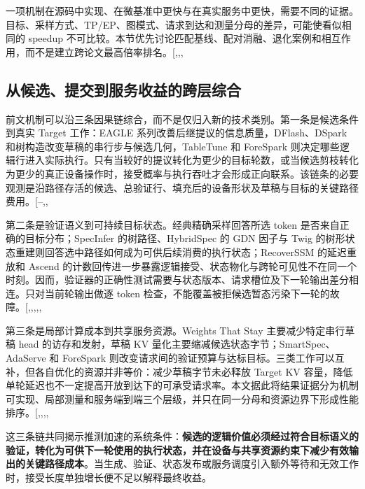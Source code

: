 \documentclass[
  a4paper,
  UTF8,
  fontset=none,
  zihao=5]{ctexart}
\begin{document}
一项机制在源码中实现、在微基准中更快与在真实服务中更快，需要不同的证据。目标、采样方式、TP/EP、图模式、请求到达和测量分母的差异，可能使看似相同的
speedup
不可比较。本节优先讨论匹配基线、配对消融、退化案例和相互作用，而不是建立跨论文最高倍率排名。{[},,,\citeproc{ref-specsearch}{61}{]}

\subsection{从候选、提交到服务收益的跨层综合}\label{cross-layer-synthesis}

前文机制可以沿三条因果链综合，而不是仅归入新的技术类别。第一条是候选条件到真实
Target 工作：EAGLE 系列改善后继提议的信息质量，DFlash、DSpark
和树构造改变草稿的串行步与候选几何，TableTune 和 ForeSpark
则决定哪些逻辑行进入实际执行。只有当较好的提议转化为更少的目标轮数，或当候选剪枝转化为更少的真正设备操作时，接受概率与执行吞吐才会形成正向联系。该链条的必要观测是沿路径存活的候选、总验证行、填充后的设备形状及草稿与目标的关键路径费用。{[}--,,\citeproc{ref-tabletune}{53}{]}

第二条是验证语义到可持续目标状态。经典精确采样回答所选 token
是否来自正确的目标分布；SpecInfer 的树路径、HybridSpec 的 GDN 因子与
Twig
的树形状态重建则回答选中路径如何成为可供后续消费的执行状态；RecoverSSM
的延迟重放和 Ascend
的计数回传进一步暴露逻辑接受、状态物化与跨轮可见性不在同一个时刻。因而，验证器的正确性测试需要与状态版本、请求槽位及下一轮输出差分相连。只对当前轮输出做逐
token
检查，不能覆盖被拒候选暂态污染下一轮的故障。{[},,,,,\citeproc{ref-pr-d2h}{31}{]}

第三条是局部计算成本到共享服务资源。Weights That Stay
主要减少特定串行草稿 head 的访存和发射，草稿 KV
量化主要缩减候选状态字节；SmartSpec、AdaServe 和 ForeSpark
则改变请求间的验证预算与达标目标。三类工作可以互补，但各自优化的资源并非等价：减少草稿字节未必释放
Target KV
容量，降低单轮延迟也不一定提高开放到达下的可承受请求率。本文据此将结果证据分为机制可实现、局部测量和服务端到端三个层级，并只在同一分母和资源边界下形成性能排序。{[},,,,\citeproc{ref-draftkv}{72}{]}

这三条链共同揭示推测加速的系统条件：\textbf{候选的逻辑价值必须经过符合目标语义的验证，转化为可供下一轮使用的执行状态，并在设备与共享资源约束下减少有效输出的关键路径成本}。当生成、验证、状态发布或服务调度引入额外等待和无效工作时，接受长度单独增长便不足以解释最终收益。
\end{document}
